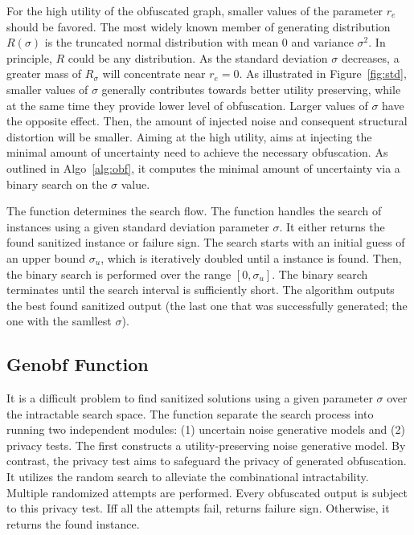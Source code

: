 For the high utility of the obfuscated graph, smaller values of the parameter $r_{e}$ should be favored.  
The most widely known member of generating distribution $R({\sigma})$ is the truncated normal distribution with mean 0 and variance $\sigma^2$. 
In principle, $R$ could be any distribution.
As the standard deviation $\sigma$ decreases, a greater mass of $R_{\sigma}$ will concentrate near $r_{e}=0$.  
As illustrated in Figure~\ref{fig:std}, smaller values of $\sigma$ generally contributes towards better utility preserving, while at the same time they provide lower level of obfuscation. 
Larger values of $\sigma$ have the opposite effect.
Then, the amount of injected noise and consequent structural distortion will be smaller. 
Aiming at the high utility, {\soaName} aims at injecting the minimal amount of uncertainty need to achieve the necessary obfuscation. 
As outlined in Algo~\ref{alg:obf}, it computes the minimal amount of uncertainty via a binary search on the $\sigma$ value. 


The function {\genobf} determines the search flow. The function {\genobf} handles the search of {\keobf} instances using a given standard deviation parameter $\sigma$. It either returns the found sanitized instance or failure sign.
The search starts with an initial guess of an upper bound $\sigma_{u}$, which is iteratively doubled until a {\keobf} instance is found. Then, the binary search is performed over the range $[0,\sigma_{u}]$. The binary search terminates until the search interval is sufficiently short. The algorithm outputs the best found sanitized output  (the last one that was successfully generated; the one with the samllest $\sigma$).

\subsection{Genobf Function}
It is a difficult problem to find {\keobf} sanitized solutions using a given parameter $\sigma$ over the intractable search space. 
The function {\genobf} separate the search process into running two independent modules: (1) uncertain noise generative models and (2) privacy tests. 
The first constructs a utility-preserving noise generative model. 
By contrast, the privacy test aims to safeguard the privacy of generated obfuscation. 
It utilizes the random search to alleviate the combinational intractability.  
Multiple randomized attempts are performed. 
Every obfuscated output is subject to this privacy test. 
Iff all the attempts fail, {\genobf} returns failure sign. Otherwise, it returns the found {\keobf} instance.  

